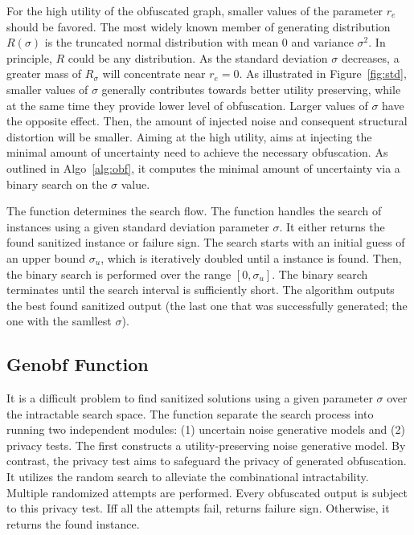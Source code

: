 For the high utility of the obfuscated graph, smaller values of the parameter $r_{e}$ should be favored.  
The most widely known member of generating distribution $R({\sigma})$ is the truncated normal distribution with mean 0 and variance $\sigma^2$. 
In principle, $R$ could be any distribution.
As the standard deviation $\sigma$ decreases, a greater mass of $R_{\sigma}$ will concentrate near $r_{e}=0$.  
As illustrated in Figure~\ref{fig:std}, smaller values of $\sigma$ generally contributes towards better utility preserving, while at the same time they provide lower level of obfuscation. 
Larger values of $\sigma$ have the opposite effect.
Then, the amount of injected noise and consequent structural distortion will be smaller. 
Aiming at the high utility, {\soaName} aims at injecting the minimal amount of uncertainty need to achieve the necessary obfuscation. 
As outlined in Algo~\ref{alg:obf}, it computes the minimal amount of uncertainty via a binary search on the $\sigma$ value. 


The function {\genobf} determines the search flow. The function {\genobf} handles the search of {\keobf} instances using a given standard deviation parameter $\sigma$. It either returns the found sanitized instance or failure sign.
The search starts with an initial guess of an upper bound $\sigma_{u}$, which is iteratively doubled until a {\keobf} instance is found. Then, the binary search is performed over the range $[0,\sigma_{u}]$. The binary search terminates until the search interval is sufficiently short. The algorithm outputs the best found sanitized output  (the last one that was successfully generated; the one with the samllest $\sigma$).

\subsection{Genobf Function}
It is a difficult problem to find {\keobf} sanitized solutions using a given parameter $\sigma$ over the intractable search space. 
The function {\genobf} separate the search process into running two independent modules: (1) uncertain noise generative models and (2) privacy tests. 
The first constructs a utility-preserving noise generative model. 
By contrast, the privacy test aims to safeguard the privacy of generated obfuscation. 
It utilizes the random search to alleviate the combinational intractability.  
Multiple randomized attempts are performed. 
Every obfuscated output is subject to this privacy test. 
Iff all the attempts fail, {\genobf} returns failure sign. Otherwise, it returns the found {\keobf} instance.  

